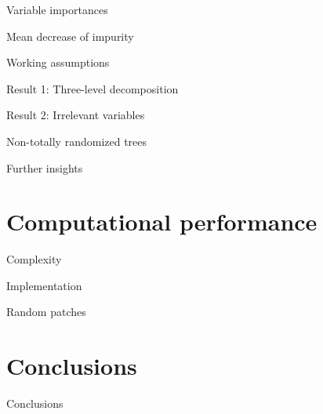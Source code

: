 \documentclass{beamer}
\begin{document}
\begin{frame}{Variable importances}
\end{frame}

\begin{frame}{Mean decrease of impurity}
\end{frame}

\begin{frame}{Working assumptions}
\end{frame}

\begin{frame}{Result 1: Three-level decomposition}
\end{frame}

\begin{frame}{Result 2: Irrelevant variables}
\end{frame}

\begin{frame}{Non-totally randomized trees}
\end{frame}

\begin{frame}{Further insights}
\end{frame}



\section{Computational performance}

\begin{frame}{Complexity}
\end{frame}

\begin{frame}{Implementation}
\end{frame}

\begin{frame}{Random patches}
\end{frame}



\section{Conclusions}

\begin{frame}{Conclusions}
\end{frame}
\end{document}
